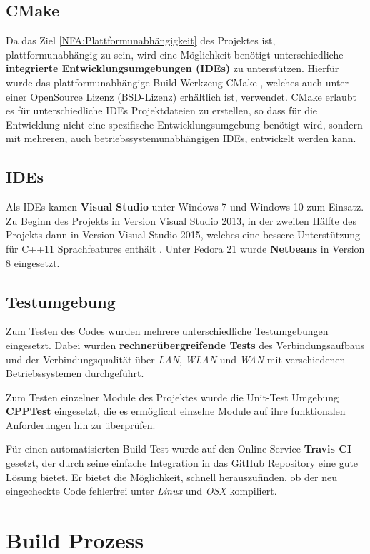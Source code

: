 \subsection{CMake}
Da das Ziel \ref{NFA:Plattformunabhängigkeit} des Projektes ist, plattformunabhängig zu sein, wird eine Möglichkeit benötigt unterschiedliche \textbf{integrierte Entwicklungsumgebungen (IDEs)} zu unterstützen.
Hierfür wurde das plattformunabhängige Build Werkzeug CMake \cite{Cmake}, welches auch unter einer OpenSource Lizenz (BSD-Lizenz) erhältlich ist, verwendet. CMake erlaubt es für unterschiedliche IDEs Projektdateien zu erstellen, so dass für die Entwicklung nicht eine spezifische Entwicklungsumgebung benötigt wird, sondern mit mehreren, auch betriebssystemunabhängigen IDEs, entwickelt werden kann.

\subsection{IDEs}
Als IDEs kamen \textbf{Visual Studio} unter Windows 7 und Windows 10 zum Einsatz. Zu Beginn des Projekts in Version Visual Studio 2013, in der zweiten Hälfte des Projekts dann in Version Visual Studio 2015, welches eine bessere Unterstützung für C++11 Sprachfeatures enthält \cite{VisualStudio:C++11}. Unter Fedora 21 wurde \textbf{Netbeans} in Version 8 eingesetzt.

\subsection{Testumgebung}
Zum Testen des Codes wurden mehrere unterschiedliche Testumgebungen eingesetzt. Dabei wurden \textbf{rechnerübergreifende Tests} des Verbindungsaufbaus und der Verbindungsqualität über \textit{LAN}, \textit{WLAN} und \textit{WAN} mit verschiedenen Betriebssystemen durchgeführt. 

Zum Testen einzelner Module des Projektes wurde die Unit-Test Umgebung \textbf{CPPTest} \cite{CppTest} eingesetzt, die es ermöglicht einzelne Module auf ihre funktionalen Anforderungen hin zu überprüfen. 

Für einen automatisierten Build-Test wurde auf den Online-Service \textbf{Travis CI} \cite{TravisCI} gesetzt, der durch seine einfache Integration in das GitHub Repository eine gute Lösung bietet. Er bietet die Möglichkeit, schnell herauszufinden, ob der neu eingecheckte Code fehlerfrei unter \textit{Linux} und \textit{OSX} kompiliert.

\section{Build Prozess}
